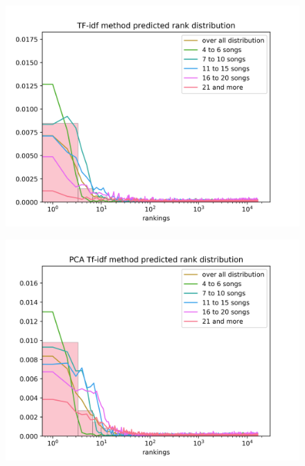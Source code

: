 \begin{figure}[h]
\centering
\begin{minipage}{.5\textwidth}
  \centering
  \includegraphics[width=1\linewidth]{./img/tf_idf_graph.png}
  \label{fig:tf_idf_distribution}
\end{minipage}%
\begin{minipage}{.5\textwidth}
  \centering
  \includegraphics[width=1\linewidth]{./img/pca_tf_idf_graph.png}
  \label{fig:pca_tf_idf_distribution}
\end{minipage}
\end{figure}
